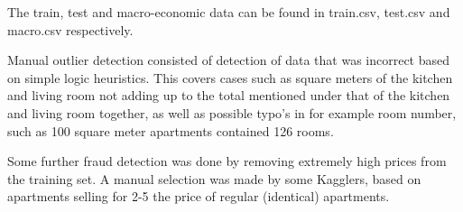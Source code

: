 \documentclass[a4paper,11pt,twocolumn]{article}
\begin{document}
The train, test and macro-economic data can be found in train.csv, test.csv and
macro.csv respectively.

Manual outlier detection consisted of detection of data that was incorrect based
on simple logic heuristics. This covers cases such as square meters of the
kitchen and living room not adding up to the total mentioned under that of the
kitchen and living room together, as well as possible typo's in for example room
number, such as 100 square meter apartments contained 126 rooms.

Some further fraud detection was done by removing extremely high prices from the
training set. A manual selection was made by some Kagglers, based on apartments
selling for 2-5 the price of regular (identical) apartments.
\end{document}
